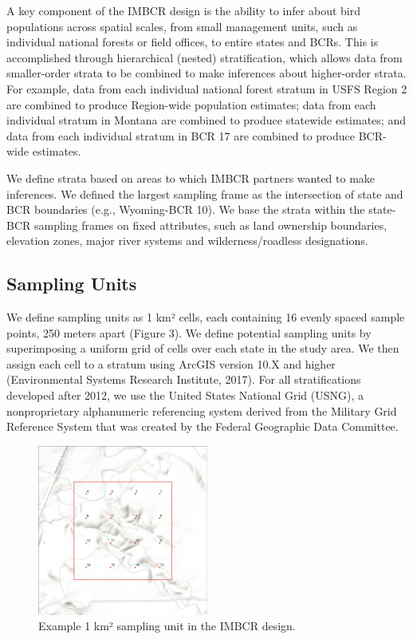 \documentclass[
  letterpaper,
  DIV=11,
  numbers=noendperiod,
  oneside]{scrreprt}
\begin{document}
A key component of the IMBCR design is the ability to infer about bird
populations across spatial scales, from small management units, such as
individual national forests or field offices, to entire states and BCRs.
This is accomplished through hierarchical (nested) stratification, which
allows data from smaller-order strata to be combined to make inferences
about higher-order strata. For example, data from each individual
national forest stratum in USFS Region 2 are combined to produce
Region-wide population estimates; data from each individual stratum in
Montana are combined to produce statewide estimates; and data from each
individual stratum in BCR 17 are combined to produce BCR-wide estimates.

We define strata based on areas to which IMBCR partners wanted to make
inferences. We defined the largest sampling frame as the intersection of
state and BCR boundaries (e.g., Wyoming-BCR 10). We base the strata
within the state-BCR sampling frames on fixed attributes, such as land
ownership boundaries, elevation zones, major river systems and
wilderness/roadless designations.

\hypertarget{sampling-units}{%
\subsection{Sampling Units}\label{sampling-units}}

We define sampling units as 1 km² cells, each containing 16 evenly
spaced sample points, 250 meters apart (Figure 3). We define potential
sampling units by superimposing a uniform grid of cells over each state
in the study area. We then assign each cell to a stratum using ArcGIS
version 10.X and higher (Environmental Systems Research Institute,
2017). For all stratifications developed after 2012, we use the United
States National Grid (USNG), a nonproprietary alphanumeric referencing
system derived from the Military Grid Reference System that was created
by the Federal Geographic Data Committee.

\begin{figure}

{\centering \includegraphics[width=0.5\textwidth,height=\textheight]{./IMBCR-sampling-unit.png}

}

\caption{\label{fig-sampling-unit}Example 1 km² sampling unit in the
IMBCR design.}

\end{figure}
\end{document}
